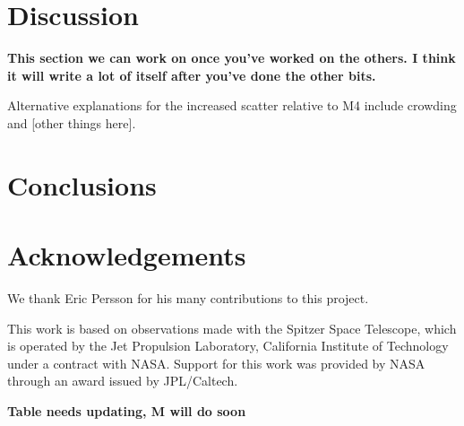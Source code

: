\documentclass[a4paper,fleqn,usenatbib]{mnras}
\begin{document}
\section{Discussion}
\label{sec:discussion}

{\bf This section we can work on once you've worked on the others. I think it will write a lot of itself after you've done the other bits.}

Alternative explanations for the increased scatter relative to M4 include crowding and [other things here].

\section{Conclusions}
\label{sec:conclusions}

\section*{Acknowledgements}
\label{sec:acknowledgements}

We thank Eric Persson for his many contributions to this project.

This work is based on observations made with the Spitzer Space Telescope, which is operated by the Jet Propulsion Laboratory, California Institute of Technology under a contract with NASA. Support for this work was provided by NASA through an award issued by JPL/Caltech.












\clearpage
\newpage

\appendix

{\bf Table needs updating, M will do soon}
\end{document}
